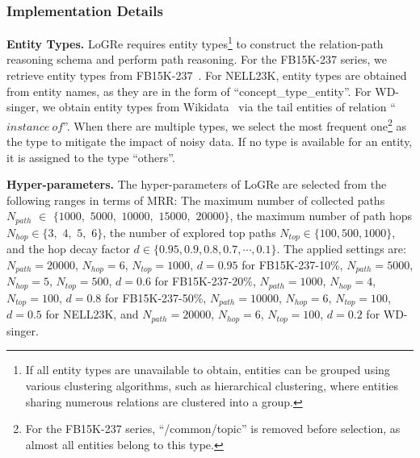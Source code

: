 \documentclass[sigconf]{acmart}
\begin{document}
\subsubsection{Implementation Details}
\label{subsubsec:implementation_details}
\textbf{Entity Types.} LoGRe requires entity types\footnote{If all entity types are unavailable to obtain, entities can be grouped using various clustering algorithms, such as hierarchical clustering, where entities sharing numerous relations are clustered into a group.} to construct the relation-path reasoning schema and perform path reasoning. For the FB15K-237 series, we retrieve entity types from FB15K-237~\cite{TKRL}. For NELL23K, entity types are obtained from entity names, as they are in the form of ``concept\_type\_entity''. For WD-singer, we obtain entity types from Wikidata~\cite{Wikidata} via the tail entities of relation ``$instance\ of$''. When there are multiple types, we select the most frequent one\footnote{For the FB15K-237 series, ``/common/topic'' is removed before selection, as almost all entities belong to this type.} as the type to mitigate the impact of noisy data. If no type is available for an entity, it is assigned to the type ``others''.

\textbf{Hyper-parameters.} The hyper-parameters of LoGRe are selected from the following ranges in terms of MRR: The maximum number of collected paths $N_{path}$ $\in$ $\{1000,$ $5000,$ $10000,$ $15000,$ $20000\}$, the maximum number of path hops $N_{hop}\in \{3,$ $4,$ $5,$ $6\}$, the number of explored top paths $N_{top} \in \{100, 500, 1000\}$, and the hop decay factor $d\in \{0.95, 0.9, 0.8, 0.7, \cdots, 0.1\}$. The applied settings are: $N_{path} = 20000$, $N_{hop} = 6$, $N_{top} = 1000$, $d = 0.95$ for FB15K-237-10\%, $N_{path} = 5000$, $N_{hop} = 5$, $N_{top} = 500$, $d = 0.6$ for FB15K-237-20\%, $N_{path} = 1000$, $N_{hop} = 4$, $N_{top} = 100$, $d = 0.8$ for FB15K-237-50\%, $N_{path} = 10000$, $N_{hop} = 6$, $N_{top} = 100$, $d = 0.5$ for NELL23K, and $N_{path} = 20000$, $N_{hop} = 6$, $N_{top} = 100$, $d = 0.2$ for WD-singer.
\end{document}
